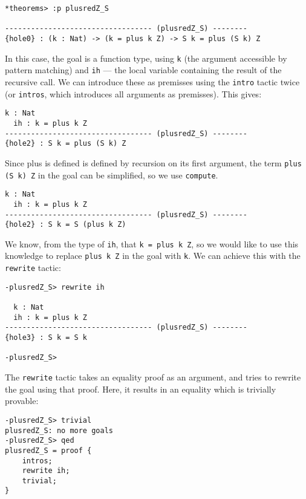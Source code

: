 \begin{lstlisting}[style=stdout]
*theorems> :p plusredZ_S

---------------------------------- (plusredZ_S) --------
{hole0} : (k : Nat) -> (k = plus k Z) -> S k = plus (S k) Z
\end{lstlisting}

\noindent
In this case, the goal is a function type, using \texttt{k} (the argument accessible by pattern matching) and \texttt{ih} --- the local variable containing the result of the recursive call.
We can introduce these as premisses using the \texttt{intro} tactic twice (or \texttt{intros}, which introduces all arguments as premisses).
This gives:

\begin{lstlisting}[style=stdout]
  k : Nat
  ih : k = plus k Z
---------------------------------- (plusredZ_S) --------
{hole2} : S k = plus (S k) Z
\end{lstlisting}

\noindent
Since plus is defined is defined by recursion on its first argument, the term \texttt{plus (S k) Z} in the goal can be simplified, so we use \texttt{compute}.

\begin{lstlisting}[style=stdout]
  k : Nat
  ih : k = plus k Z
---------------------------------- (plusredZ_S) --------
{hole2} : S k = S (plus k Z)
\end{lstlisting}

\noindent
We know, from the type of \texttt{ih}, that \texttt{k = plus k Z}, so we would like to use this knowledge to replace \texttt{plus k Z} in the goal with \texttt{k}.
We can achieve this with the \texttt{rewrite} tactic:

\begin{lstlisting}[style=stdout]
-plusredZ_S> rewrite ih

  k : Nat
  ih : k = plus k Z
---------------------------------- (plusredZ_S) --------
{hole3} : S k = S k

-plusredZ_S>
\end{lstlisting}

\noindent
The \texttt{rewrite} tactic takes an equality proof as an argument, and tries to rewrite the goal using that proof. Here, it results in an equality which is trivially provable:

\begin{lstlisting}[style=stdout]
-plusredZ_S> trivial
plusredZ_S: no more goals
-plusredZ_S> qed
plusredZ_S = proof {
    intros;
    rewrite ih;
    trivial;
}
\end{lstlisting}

